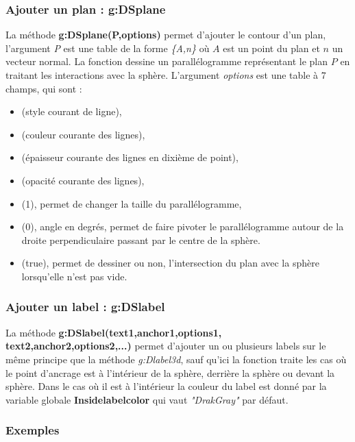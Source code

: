 \subsubsection{ Ajouter un plan : g:DSplane}

La méthode \textbf{g:DSplane(P,options)} permet d'ajouter le contour d'un plan, l'argument \emph{P} est une table de la forme \emph{\{A,n\}} où $A$ est un point du plan et $n$ un vecteur normal. La fonction dessine un parallélogramme représentant le plan $P$ en traitant les interactions avec la sphère. L'argument \emph{options} est une table à 7 champs, qui sont :
    \begin{itemize}
        \item {} (style courant de ligne), 
        \item {} (couleur courante des lignes),
        \item {} (épaisseur courante des lignes en dixième de point),
        \item {} (opacité courante des lignes),
        \item {} (1), permet de changer la taille du parallélogramme,
        \item {} (0), angle en degrés, permet de faire pivoter le parallélogramme autour de la droite perpendiculaire passant par le centre de la sphère.
        \item {} (true), permet de dessiner ou non, l'intersection du plan avec la sphère lorsqu'elle n'est pas vide.
    \end{itemize}    

\subsubsection{Ajouter un label : g:DSlabel}

La méthode \textbf{g:DSlabel(text1,anchor1,options1, text2,anchor2,options2,...)} permet d'ajouter un ou plusieurs labels sur le même principe que la méthode \emph{g:Dlabel3d}, sauf qu'ici la fonction traite les cas où le point d'ancrage est à l'intérieur de la sphère, derrière la sphère ou devant la sphère. Dans le cas où il est à l'intérieur la couleur du label est donné par la variable globale \textbf{Insidelabelcolor} qui vaut \emph{"DrakGray"} par défaut.

\subsubsection{Exemples}

